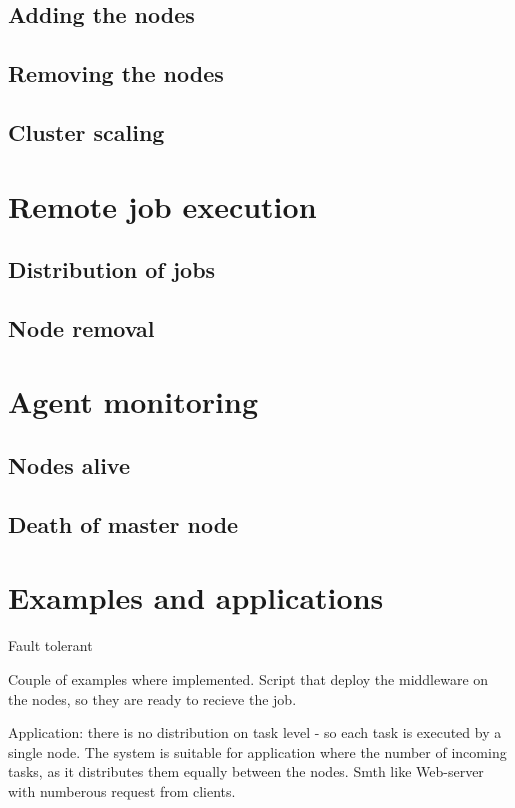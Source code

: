 \documentclass[12pt]{article}
\begin{document}
\subsection{Adding the nodes}
\subsection{Removing the nodes}
\subsection{Cluster scaling}
\section{Remote job execution}
\subsection{Distribution of jobs}
\subsection{Node removal}
\section{Agent monitoring}
\subsection{Nodes alive}
\subsection{Death of master node}
\section{Examples and applications}


Fault tolerant

Couple of examples where implemented. Script that deploy the middleware on the nodes, so they are ready to recieve the job.

Application: there is no distribution on task level - so each task is executed by a single node. The system is suitable for application where the number of incoming tasks, as it distributes them equally between the nodes. Smth like Web-server with numberous request from clients.
\end{document}
